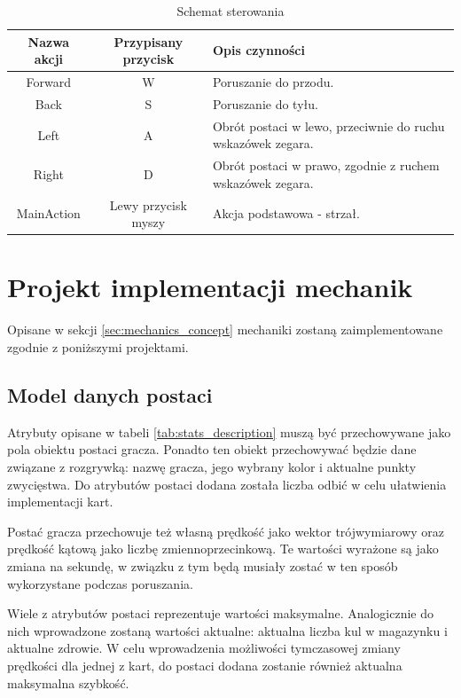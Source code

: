 \begin{table}
    \small
    \centering
    \caption{Schemat sterowania}
    \label{tab:steering}
    \begin{tabularx}{\linewidth}{|c|c|X|}
        \hline
        Nazwa akcji & Przypisany przycisk & Opis czynności\\
        \hline \hline
        Forward & W & Poruszanie do przodu. \\
        \hline
        Back & S & Poruszanie do tyłu. \\
        \hline
        Left & A & Obrót postaci w lewo, przeciwnie do ruchu wskazówek zegara.\\
        \hline
        Right & D & Obrót postaci w prawo, zgodnie z ruchem wskazówek zegara.\\
        \hline 
        MainAction & Lewy przycisk myszy & Akcja podstawowa - strzał.\\
        \hline
    \end{tabularx}
\end{table}



\section{Projekt implementacji mechanik}
Opisane w sekcji \ref{sec:mechanics_concept} mechaniki zostaną zaimplementowane zgodnie z poniższymi projektami.

\subsection{Model danych postaci}
Atrybuty opisane w tabeli \ref{tab:stats_description} muszą być przechowywane jako pola obiektu postaci gracza. Ponadto ten obiekt przechowywać będzie dane związane z rozgrywką: nazwę gracza, jego wybrany kolor i aktualne punkty zwycięstwa. Do atrybutów postaci dodana została liczba odbić w celu ułatwienia implementacji kart.

Postać gracza przechowuje też własną prędkość jako wektor trójwymiarowy oraz prędkość kątową jako liczbę zmiennoprzecinkową. Te wartości wyrażone są jako zmiana na sekundę, w związku z tym będą musiały zostać w ten sposób wykorzystane podczas poruszania.

Wiele z atrybutów postaci reprezentuje wartości maksymalne. Analogicznie do nich wprowadzone zostaną wartości aktualne: aktualna liczba kul w magazynku i aktualne zdrowie. W celu wprowadzenia możliwości tymczasowej zmiany prędkości dla jednej z kart, do postaci dodana zostanie również aktualna maksymalna szybkość. 

